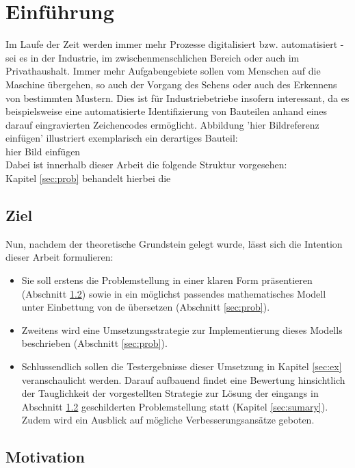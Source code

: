 
\chapter{Einführung}
\label{sec:intro}
	
	Im Laufe der Zeit werden immer mehr Prozesse digitalisiert bzw. 
	automatisiert - sei es in der Industrie, im zwischenmenschlichen 
	Bereich oder auch im Privathaushalt. Immer mehr Aufgabengebiete sollen vom 
	Menschen auf die Maschine übergehen, so auch der Vorgang des Sehens oder 
	auch des Erkennens von bestimmten Mustern. Dies ist für Industriebetriebe 
	insofern interessant, da es beispielsweise eine automatisierte 
	Identifizierung von Bauteilen anhand eines darauf eingravierten 
	Zeichencodes ermöglicht. Abbildung 'hier Bildreferenz einfügen' illustriert 
	exemplarisch ein derartiges Bauteil:\\
	
	hier Bild einfügen \\
	
	
	
	Dabei ist innerhalb dieser Arbeit die folgende Struktur vorgesehen: \\
	Kapitel \ref{sec:prob} behandelt hierbei die 
		
	\section{Ziel}
	\label{sec:ziel}
	
		Nun, nachdem der theoretische Grundstein gelegt wurde, lässt sich die Intention dieser Arbeit formulieren:
		\begin{itemize}
			\item Sie soll erstens die Problemstellung in einer klaren Form präsentieren (Abschnitt \ref{sec:motivation}) sowie in ein möglichst passendes mathematisches Modell unter Einbettung von \gls{de} übersetzen (Abschnitt \ref{sec:prob}).
			\item Zweitens wird eine Umsetzungsstrategie zur Implementierung dieses Modells beschrieben (Abschnitt \ref{sec:prob}).
			\item Schlussendlich sollen die Testergebnisse dieser Umsetzung in Kapitel \ref{sec:ex} veranschaulicht werden. Darauf aufbauend findet eine Bewertung hinsichtlich der Tauglichkeit der vorgestellten Strategie zur Lösung der eingangs in Abschnitt \ref{sec:motivation} geschilderten Problemstellung statt (Kapitel \ref{sec:sumary}). Zudem wird ein Ausblick auf mögliche Verbesserungsansätze geboten. 
		\end{itemize}
	
	\section{Motivation}
	\label{sec:motivation}